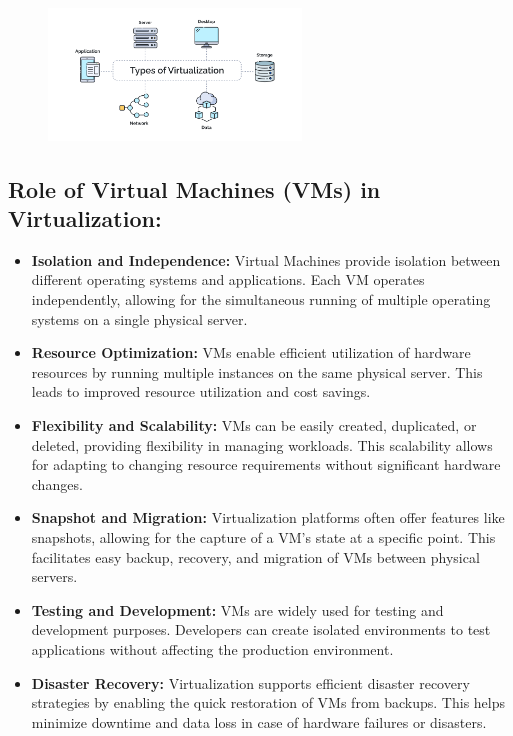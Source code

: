 \documentclass{report}
\begin{document}
\begin{figure}[h] 
    \centering 
    \includegraphics[width=0.6\textwidth]{3.png}
\end{figure} 

\subsection*{Role of Virtual Machines (VMs) in Virtualization:\cite{3}}

\begin{itemize}
  \item \textbf{Isolation and Independence:}
    Virtual Machines provide isolation between different operating systems and applications. Each VM operates independently, allowing for the simultaneous running of multiple operating systems on a single physical server.

  \item \textbf{Resource Optimization:}
    VMs enable efficient utilization of hardware resources by running multiple instances on the same physical server. This leads to improved resource utilization and cost savings.

  \item \textbf{Flexibility and Scalability:}
    VMs can be easily created, duplicated, or deleted, providing flexibility in managing workloads. This scalability allows for adapting to changing resource requirements without significant hardware changes.

  \item \textbf{Snapshot and Migration:}
    Virtualization platforms often offer features like snapshots, allowing for the capture of a VM's state at a specific point. This facilitates easy backup, recovery, and migration of VMs between physical servers.

  \item \textbf{Testing and Development:}
    VMs are widely used for testing and development purposes. Developers can create isolated environments to test applications without affecting the production environment.

  \item \textbf{Disaster Recovery:}
    Virtualization supports efficient disaster recovery strategies by enabling the quick restoration of VMs from backups. This helps minimize downtime and data loss in case of hardware failures or disasters.
\end{itemize}
\end{document}
